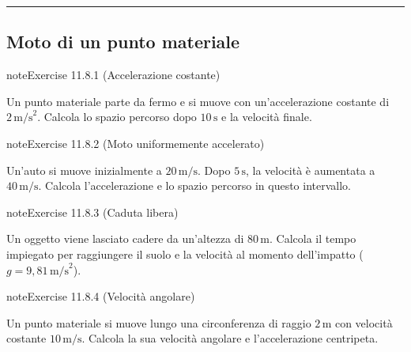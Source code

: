 \documentclass[letterpaper,10pt,italian]{jupyterBook}
\begin{document}
\bigskip\hrule\bigskip



\subsection{Moto di un punto materiale}
\label{\detokenize{ch/mechanics/dynamics-problems:moto-di-un-punto-materiale}} \label{exercise:ch/mechanics/dynamics-problems-exercise-0}

\begin{sphinxadmonition}{note}{Exercise 11.8.1 (Accelerazione costante)}



\sphinxAtStartPar
Un punto materiale parte da fermo e si muove con un’accelerazione costante di \(2 \, \text{m/s}^2\). Calcola lo spazio percorso dopo \(10 \, \text{s}\) e la velocità finale.
\end{sphinxadmonition}
 \label{exercise:ch/mechanics/dynamics-problems-exercise-1}

\begin{sphinxadmonition}{note}{Exercise 11.8.2 (Moto uniformemente accelerato)}



\sphinxAtStartPar
Un’auto si muove inizialmente a \(20 \, \text{m/s}\). Dopo \(5 \, \text{s}\), la velocità è aumentata a \(40 \, \text{m/s}\). Calcola l’accelerazione e lo spazio percorso in questo intervallo.
\end{sphinxadmonition}
 \label{exercise:ch/mechanics/dynamics-problems-exercise-2}

\begin{sphinxadmonition}{note}{Exercise 11.8.3 (Caduta libera)}



\sphinxAtStartPar
Un oggetto viene lasciato cadere da un’altezza di \(80 \, \text{m}\). Calcola il tempo impiegato per raggiungere il suolo e la velocità al momento dell’impatto (\(g = 9,81 \, \text{m/s}^2\)).
\end{sphinxadmonition}
 \label{exercise:ch/mechanics/dynamics-problems-exercise-3}

\begin{sphinxadmonition}{note}{Exercise 11.8.4 (Velocità angolare)}



\sphinxAtStartPar
Un punto materiale si muove lungo una circonferenza di raggio \(2 \, \text{m}\) con velocità costante \(10 \, \text{m/s}\). Calcola la sua velocità angolare e l’accelerazione centripeta.
\end{sphinxadmonition}
 \label{exercise:ch/mechanics/dynamics-problems-exercise-4}
\end{document}
